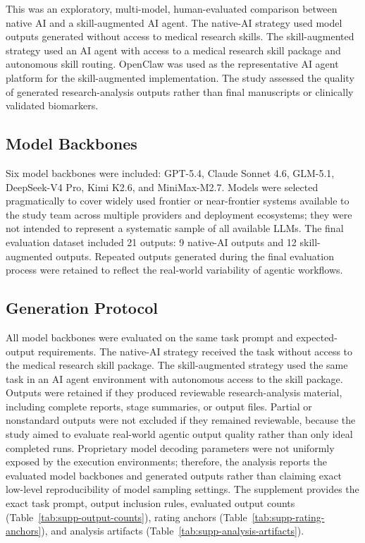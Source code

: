 \documentclass[11pt]{article}
\begin{document}
This was an exploratory, multi-model, human-evaluated comparison between native AI and a skill-augmented AI agent. The native-AI strategy used model outputs generated without access to medical research skills. The skill-augmented strategy used an AI agent with access to a medical research skill package and autonomous skill routing. OpenClaw was used as the representative AI agent platform for the skill-augmented implementation. The study assessed the quality of generated research-analysis outputs rather than final manuscripts or clinically validated biomarkers.

\subsection{Model Backbones}

Six model backbones were included: GPT-5.4, Claude Sonnet 4.6, GLM-5.1, DeepSeek-V4 Pro, Kimi K2.6, and MiniMax-M2.7. Models were selected pragmatically to cover widely used frontier or near-frontier systems available to the study team across multiple providers and deployment ecosystems; they were not intended to represent a systematic sample of all available LLMs. The final evaluation dataset included 21 outputs: 9 native-AI outputs and 12 skill-augmented outputs. Repeated outputs generated during the final evaluation process were retained to reflect the real-world variability of agentic workflows.

\subsection{Generation Protocol}

All model backbones were evaluated on the same task prompt and expected-output requirements. The native-AI strategy received the task without access to the medical research skill package. The skill-augmented strategy used the same task in an AI agent environment with autonomous access to the skill package. Outputs were retained if they produced reviewable research-analysis material, including complete reports, stage summaries, or output files. Partial or nonstandard outputs were not excluded if they remained reviewable, because the study aimed to evaluate real-world agentic output quality rather than only ideal completed runs. Proprietary model decoding parameters were not uniformly exposed by the execution environments; therefore, the analysis reports the evaluated model backbones and generated outputs rather than claiming exact low-level reproducibility of model sampling settings. The supplement provides the exact task prompt, output inclusion rules, evaluated output counts (Table~\ref{tab:supp-output-counts}), rating anchors (Table~\ref{tab:supp-rating-anchors}), and analysis artifacts (Table~\ref{tab:supp-analysis-artifacts}).
\end{document}
